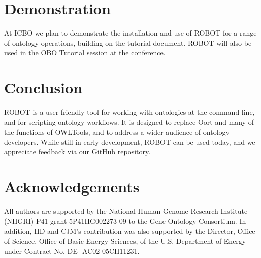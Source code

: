 \documentclass{icbo}
\begin{document}
\section{Demonstration}

At ICBO we plan to demonstrate the installation and use of ROBOT for a range of ontology operations, building on the tutorial document. ROBOT will also be used in the OBO Tutorial session at the conference.


\section{Conclusion}

ROBOT is a user-friendly tool for working with ontologies at the command line, and for scripting ontology workflows. It is designed to replace Oort and many of the functions of OWLTools, and to address a wider audience of ontology developers. While still in early development, ROBOT can be used today, and we appreciate feedback via our GitHub repository.


\section*{Acknowledgements}

All authors are supported by the National Human Genome Research Institute (NHGRI) P41 grant 5P41HG002273-09 to the Gene Ontology Consortium. In addition, HD and CJM’s contribution was also supported by the Director, Office of Science, Office of Basic Energy Sciences, of the U.S. Department of Energy under Contract No. DE- AC02-05CH11231.






\vspace{80pt}
\end{document}
